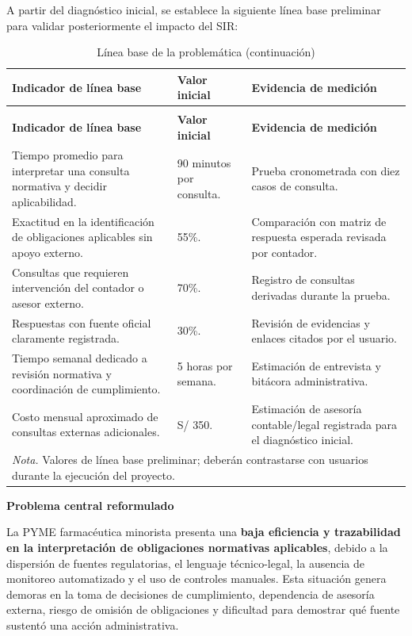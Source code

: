 \documentclass[12pt,a4paper,oneside]{report}
\begin{document}
A partir del diagnóstico inicial, se establece la siguiente línea base preliminar para validar posteriormente el impacto del SIR:

\begin{longtable}{@{}p{}p{}p{}@{}}
\caption{Línea base de la problemática}\label{tab:linea-base-problematica}\\
\toprule
\textbf{Indicador de línea base} & \textbf{Valor inicial} & \textbf{Evidencia de medición} \\
\midrule
\endfirsthead
\caption[]{Línea base de la problemática (continuación)}\\
\toprule
\textbf{Indicador de línea base} & \textbf{Valor inicial} & \textbf{Evidencia de medición} \\
\midrule
\endhead
Tiempo promedio para interpretar una consulta normativa y decidir aplicabilidad. & 90 minutos por consulta. & Prueba cronometrada con diez casos de consulta. \\
Exactitud en la identificación de obligaciones aplicables sin apoyo externo. & 55\%. & Comparación con matriz de respuesta esperada revisada por contador. \\
Consultas que requieren intervención del contador o asesor externo. & 70\%. & Registro de consultas derivadas durante la prueba. \\
Respuestas con fuente oficial claramente registrada. & 30\%. & Revisión de evidencias y enlaces citados por el usuario. \\
Tiempo semanal dedicado a revisión normativa y coordinación de cumplimiento. & 5 horas por semana. & Estimación de entrevista y bitácora administrativa. \\
Costo mensual aproximado de consultas externas adicionales. & S/ 350. & Estimación de asesoría contable/legal registrada para el diagnóstico inicial. \\
\bottomrule
\multicolumn{3}{p{0.94\textwidth}}{\normalsize \textit{Nota.} Valores de línea base preliminar; deberán contrastarse con usuarios durante la ejecución del proyecto.}\\
\end{longtable}

\textbf{Problema central reformulado}

La PYME farmacéutica minorista presenta una \textbf{baja eficiencia y trazabilidad en la interpretación de obligaciones normativas aplicables}, debido a la dispersión de fuentes regulatorias, el lenguaje técnico-legal, la ausencia de monitoreo automatizado y el uso de controles manuales. Esta situación genera demoras en la toma de decisiones de cumplimiento, dependencia de asesoría externa, riesgo de omisión de obligaciones y dificultad para demostrar qué fuente sustentó una acción administrativa.
\end{document}
